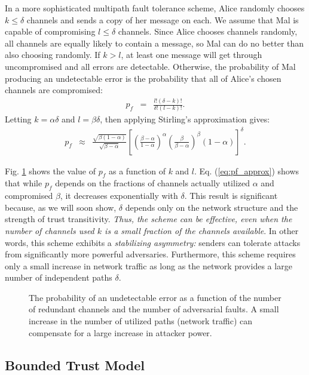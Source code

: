 \documentclass[10pt,letterpaper]{article}
\newcommand{\beq}{\begin{eqnarray}}
\newcommand{\eeq}{\end{eqnarray}}
\begin{document}
In a more sophisticated multipath fault tolerance scheme,
Alice randomly chooses $k \leq \delta$ channels and sends a copy of
her message on each.
We assume that Mal is capable of compromising $l \leq \delta$ channels.
Since Alice chooses channels randomly,
all channels are equally likely to contain a message,
so Mal can do no better than also choosing randomly.
If $k > l$, at least one message will get through uncompromised and all
errors are detectable.
Otherwise, the probability of Mal producing an undetectable error is
the probability that all of Alice's chosen channels are compromised:
\beq
\label{eq:pf}
p_f &=& \frac{l!(\delta-k)!}{\delta!(l-k)!}.
\eeq
Letting $k=\alpha \delta$ and $l=\beta \delta$, then applying Stirling's
approximation gives:
\begin{eqnarray}
\label{eq:pf_approx}
p_f &\approx&
\frac{\sqrt{\beta(1-\alpha)}}{\sqrt{\beta-\alpha}}
\left[
    \left( \frac{\beta-\alpha}{1-\alpha} \right)^{\alpha}
    \left( \frac{\beta}{\beta-\alpha} \right)^{\beta}
    (1-\alpha)
\right]^{\delta}.
\end{eqnarray}

Fig. \ref{fig:pfail} shows the value of $p_f$
as a function of $k$ and $l$.
Eq. (\ref{eq:pf_approx}) shows that while $p_f$
depends on the fractions of
channels actually utilized $\alpha$ and compromised $\beta$,
it decreases exponentially with $\delta$.
This result is significant because,
as we will soon show, $\delta$
depends only on the network structure
and the strength of trust transitivity.
{\em Thus, the scheme can be effective, even when the number of channels used
$k$ is a small fraction of the channels available}.
In other words, this scheme exhibits a {\em stabilizing asymmetry:}
senders can tolerate attacks from significantly more powerful
adversaries.
Furthermore, this scheme requires only a small increase in network traffic
as long as the network provides a large number of independent paths $\delta$.

\begin{figure}[H]
\caption{
The probability of an undetectable error as a function of the number of
redundant channels and the number of adversarial faults.
A small increase in the number of utilized paths (network traffic)
can compensate for a large increase in attacker power.
}
\label{fig:pfail}
\end{figure}

\subsection*{Bounded Trust Model}
\end{document}
